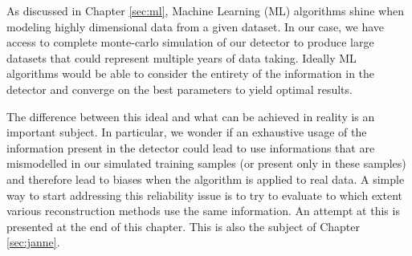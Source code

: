 \documentclass[../main.tex]{subfiles}
\begin{document}

As discussed in Chapter \ref{sec:ml}, Machine Learning (ML) algorithms shine when modeling highly dimensional data from a given dataset. In our case, we have access to complete monte-carlo simulation of our detector to produce large datasets that could represent multiple years of data taking.
Ideally ML algorithms would be able to consider the entirety of the information in the detector and converge on the best parameters to yield optimal results.

The difference between this ideal and what can be achieved in reality is an important subject. In particular, we wonder if an exhaustive usage of the information present in the detector could lead to use informations that are mismodelled in our simulated training samples (or present only in these samples) and therefore lead to biases when the algorithm is applied to real data.
A simple way to start addressing this reliability issue is to try to evaluate to which extent various reconstruction methods use the same information. An attempt at this is presented at the end of this chapter. This is also the subject of Chapter \ref{sec:janne}.

\end{document}
